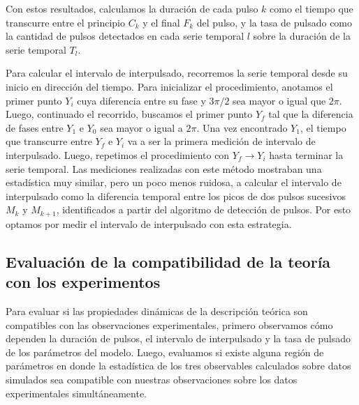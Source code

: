 \documentclass[./main.tex]{subfiles}
\begin{document}
Con estos resultados, calculamos la duración de cada pulso $k$ como el tiempo que transcurre entre el principio $C_k$ y el final $F_k$ del pulso, y la tasa de pulsado como la cantidad de pulsos detectados en cada serie temporal $l$ sobre la duración de la serie temporal $T_l$. 


Para calcular el intervalo de interpulsado, recorremos la serie temporal desde su inicio en dirección del tiempo. Para inicializar el procedimiento, anotamos el primer punto $Y_i$ cuya diferencia entre su fase y $3\pi/2$ sea mayor o igual que $2\pi$. Luego, continuado el recorrido, buscamos el primer punto $Y_f$ tal que la diferencia de fases entre $Y_1$ e $Y_0$ sea mayor o igual a $2\pi$. Una vez encontrado $Y_1$, el tiempo que transcurre entre $Y_f$ e $Y_i$ va a ser la primera medición de intervalo de interpulsado. Luego, repetimos el procedimiento  con $Y_f \rightarrow Y_i$ hasta terminar la serie temporal. Las mediciones realizadas con este método mostraban una estadística muy similar, pero un poco menos ruidosa, a calcular el intervalo de interpulsado como la diferencia temporal entre los picos de dos pulsos sucesivos $M_k$ y $M_{k+1}$, identificados a partir del algoritmo de detección de pulsos. Por esto optamos por medir el intervalo de interpulsado con esta estrategia. 


\subsection{Evaluación de la compatibilidad de la teoría con los experimentos}

Para evaluar si las propiedades dinámicas de la descripción teórica son compatibles con las observaciones experimentales, primero observamos cómo dependen la duración de pulsos, el intervalo de interpulsado y la tasa de pulsado de los parámetros del modelo. Luego, evaluamos si existe alguna región de parámetros en donde la estadística de los tres observables calculados sobre datos simulados sea compatible con nuestras observaciones sobre los datos experimentales simultáneamente. 
\end{document}
